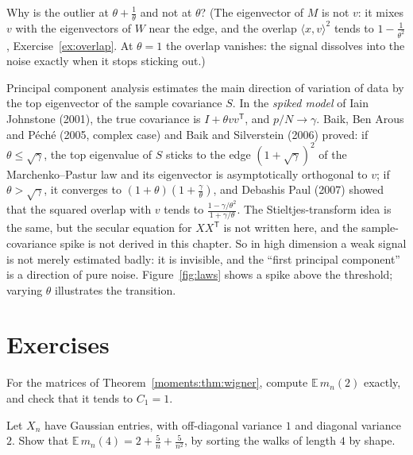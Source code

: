 \begin{think}
Why is the outlier at $\theta+\frac1\theta$ and not at $\theta$? (The eigenvector of $M$ is not $v$: it mixes $v$ with the eigenvectors of $W$ near the edge, and the overlap $\langle x,v\rangle^2$ tends to $1-\frac1{\theta^2}$, Exercise~\ref{ex:overlap}. At
$\theta=1$ the overlap vanishes: the signal dissolves into the noise exactly when it stops sticking out.)
\end{think}

\begin{remark}
Principal component analysis estimates the main direction of variation of data by the top eigenvector of the sample covariance $S$. In the \emph{spiked model} of Iain Johnstone (2001), the true covariance is $I+\theta vv^{\mathsf T}$, and
$p/N\to\gamma$. Baik, Ben Arous and P\'ech\'e (2005, complex case) and Baik and Silverstein (2006) proved: if $\theta\le\sqrt\gamma$, the top eigenvalue of $S$ sticks to the edge $(1+\sqrt\gamma)^2$ of the Marchenko--Pastur law and its
eigenvector is asymptotically orthogonal to $v$; if $\theta>\sqrt\gamma$, it converges to $(1+\theta)(1+\frac\gamma\theta)$, and Debashis Paul (2007) showed that the squared overlap with $v$ tends to
$\frac{1-\gamma/\theta^2}{1+\gamma/\theta}$. The Stieltjes-transform idea is the same, but the secular equation for $XX^{\mathsf T}$ is not written here, and the sample-covariance spike is not derived in this chapter. So in high dimension a weak signal is not merely estimated badly: it is invisible, and the
``first principal component'' is a direction of pure noise. Figure~\ref{fig:laws} shows a spike above the threshold; varying $\theta$ illustrates the transition.
\end{remark}

\section{Exercises}
\begin{exercise}[$\star$]\label{moments:ex:trace2}
For the matrices of Theorem~\ref{moments:thm:wigner}, compute $\mathbb E\,m_n(2)$ exactly, and check that it tends to $C_1=1$.
\end{exercise}
\begin{exercise}[$\star\star$]\label{moments:ex:trace4}
Let $X_n$ have Gaussian entries, with off-diagonal variance $1$ and diagonal variance $2$. Show that $\mathbb E\,m_n(4)=2+\frac5n+\frac5{n^2}$, by sorting the walks of
length $4$ by shape.
\end{exercise}

